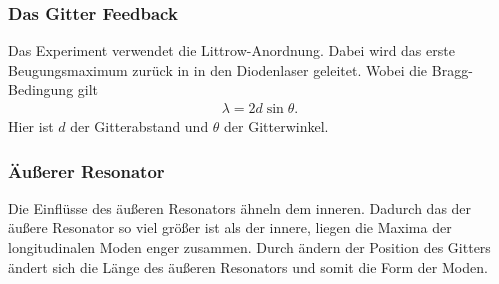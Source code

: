 \subsubsection{Das Gitter Feedback}
Das Experiment verwendet die Littrow-Anordnung.
Dabei wird das erste Beugungsmaximum zurück in in den Diodenlaser geleitet.
Wobei die Bragg-Bedingung gilt
\begin{align}
	\lambda = 2d\sin\theta.
\end{align}
Hier ist $d$ der Gitterabstand und $\theta$ der Gitterwinkel.
\subsubsection{Äußerer Resonator}
Die Einflüsse des äußeren Resonators ähneln dem inneren. 
Dadurch das der äußere Resonator so viel größer ist als der innere, liegen die Maxima der longitudinalen Moden enger zusammen.
Durch ändern der Position des Gitters ändert sich die Länge des äußeren Resonators und somit die Form der Moden.
